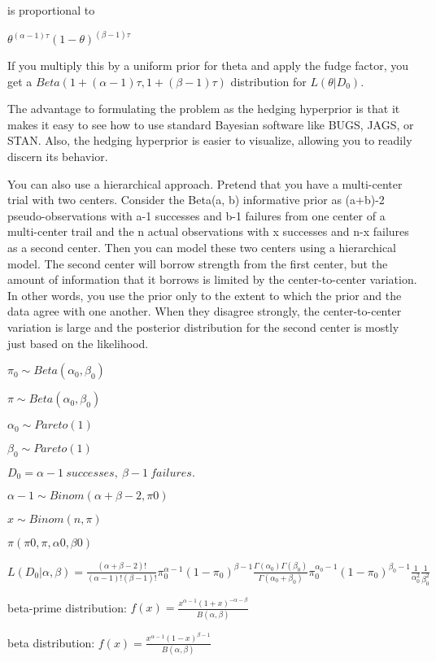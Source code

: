 \documentclass[12pt]{article}
\begin{document}
is proportional to

$\theta^{(\alpha-1)\tau}(1-\theta)^{(\beta-1)\tau}$

If you multiply this by a uniform prior for theta and apply the fudge factor, you get a $Beta(1+(\alpha-1)\tau,1+(\beta-1)\tau)$ distribution for $L(\theta|D_0)$.

The advantage to formulating the problem as the hedging hyperprior is that it makes it easy to see how to use standard Bayesian software like BUGS, JAGS, or STAN. Also, the hedging hyperprior is easier to visualize, allowing you to readily discern its behavior.

You can also use a hierarchical approach. Pretend that you have a multi-center trial with two centers. Consider the Beta(a, b) informative prior as (a+b)-2 pseudo-observations with a-1 successes and b-1 failures from one center of a multi-center trail and the n actual observations with x successes and n-x failures as a second center. Then you can model these two centers using a hierarchical model. The second center will borrow strength from the first center, but the amount of information that it borrows is limited by the center-to-center variation. In other words, you use the prior only to the extent to which the prior and the data agree with one another. When they disagree strongly, the center-to-center variation is large and the posterior distribution for the second center is mostly just based on the likelihood.

$\pi_0 \sim Beta(\alpha_0,\beta_0)$

$\pi \sim Beta(\alpha_0,\beta_0)$

$\alpha_0 \sim Pareto(1)$

$\beta_0 \sim Pareto(1)$

$D_0 = \alpha-1~successes,~\beta-1~failures.$

$\alpha-1 \sim Binom(\alpha+\beta-2, \pi0)$

$x \sim Binom(n, \pi)$

$\pi(\pi0, \pi, \alpha0, \beta0)$

$L(D_0|\alpha,\beta)= \frac{(\alpha+\beta-2)!}{(\alpha-1)!(\beta-1)!}\pi_0^{\alpha-1}(1-\pi_0)^{\beta-1}\frac{\Gamma(\alpha_0)\Gamma(\beta_0)}{\Gamma(\alpha_0+\beta_0)}\pi_0^{\alpha_0-1}(1-\pi_0)^{\beta_0-1}\frac{1}{\alpha_0^2}\frac{1}{\beta_0^2}$

beta-prime distribution: $f(x) = \frac{x^{\alpha-1} (1+x)^{-\alpha -\beta}}{B(\alpha,\beta)}$

beta distribution: $f(x)=\frac{x^{\alpha-1}(1-x)^{\beta-1}}{B(\alpha,\beta)}$
\end{document}
